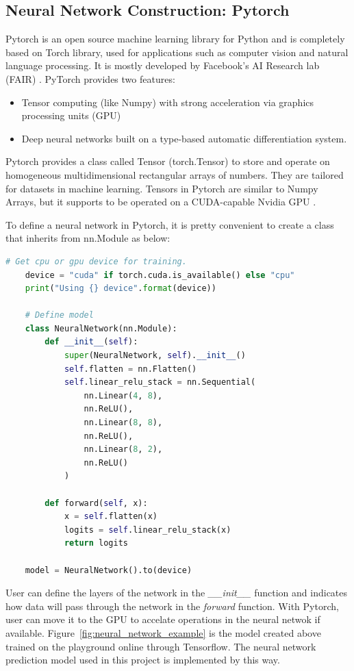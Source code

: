 \documentclass[final-report]{report-template}
\begin{document}
\subsection{Neural Network Construction: Pytorch}
Pytorch is an open source machine learning library for Python and is completely based on Torch library,
used for applications such as computer vision and natural language processing. It is mostly developed by Facebook's AI Research lab (FAIR) \citep{patel2018two}. 
PyTorch provides two features:
\begin{itemize}
    \item Tensor computing (like Numpy) with strong acceleration via graphics processing units (GPU)
    \item Deep neural networks built on a type-based automatic differentiation system.
  \end{itemize}
Pytorch provides a class called Tensor (torch.Tensor) to store and operate on homogeneous multidimensional rectangular arrays of numbers. 
They are tailored for datasets in machine learning. Tensors in Pytorch are similar to Numpy Arrays, but it supports to be operated on a CUDA-capable Nvidia GPU \citep{paszke2019pytorch}.

To define a neural network in Pytorch, it is pretty convenient to create a class that inherits from nn.Module as below:
\begin{lstlisting}[language=Python]
    # Get cpu or gpu device for training.
    device = "cuda" if torch.cuda.is_available() else "cpu"
    print("Using {} device".format(device))
    
    # Define model
    class NeuralNetwork(nn.Module):
        def __init__(self):
            super(NeuralNetwork, self).__init__()
            self.flatten = nn.Flatten()
            self.linear_relu_stack = nn.Sequential(
                nn.Linear(4, 8),
                nn.ReLU(),
                nn.Linear(8, 8),
                nn.ReLU(),
                nn.Linear(8, 2),
                nn.ReLU()
            )
    
        def forward(self, x):
            x = self.flatten(x)
            logits = self.linear_relu_stack(x)
            return logits
    
    model = NeuralNetwork().to(device)
\end{lstlisting}
User can define the layers of the network in the \textit{\_\_init\_\_} function and indicates how data will pass through the network in the \textit{forward} function. 
With Pytorch, user can move it to the GPU to accelate operations in the neural netwok if available. Figure~\ref{fig:neural_network_example} is the model created above trained on the playground online through Tensorflow. 
The neural network prediction model used in this project is implemented by this way.
\end{document}

